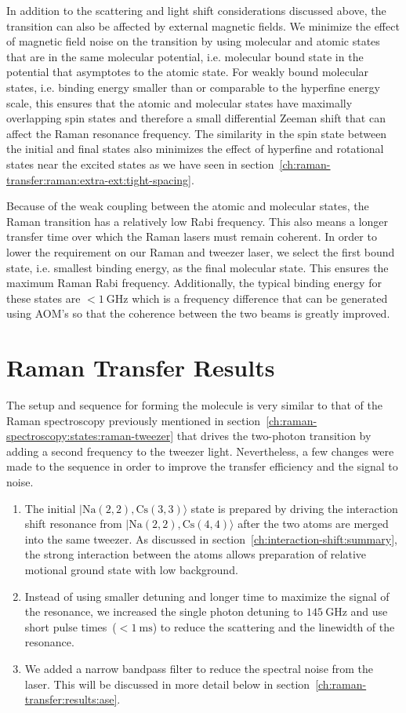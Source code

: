 In addition to the scattering and light shift considerations discussed above,
the transition can also be affected by external magnetic fields.
We minimize the effect of magnetic field noise on the transition by using molecular
and atomic states that are in the same molecular potential,
i.e. molecular bound state in the potential that asymptotes to
the atomic state. For weakly bound molecular states,
i.e. binding energy smaller than or comparable to the hyperfine energy scale,
this ensures that the atomic and molecular states have maximally overlapping spin states
and therefore a small differential Zeeman shift that can affect the Raman resonance frequency.
The similarity in the spin state between the initial and final states
also minimizes the effect of hyperfine and rotational states near the excited states
as we have seen in section~\ref{ch:raman-transfer:raman:extra-ext:tight-spacing}.

Because of the weak coupling between the atomic and molecular states,
the Raman transition has a relatively low Rabi frequency.
This also means a longer transfer time over which the Raman lasers must remain coherent.
In order to lower the requirement on our Raman and tweezer laser,
we select the first bound state, i.e. smallest binding energy, as the final molecular state.
This ensures the maximum Raman Rabi frequency.
Additionally, the typical binding energy for these states are $<\!1~\mathrm{GHz}$
which is a frequency difference that can be generated using AOM's
so that the coherence between the two beams is greatly improved.

\section{Raman Transfer Results}
\label{ch:raman-transfer:results}

The setup and sequence for forming the molecule is very similar to
that of the Raman spectroscopy
previously mentioned in section~\ref{ch:raman-spectroscopy:states:raman-tweezer}
that drives the two-photon transition by adding a second frequency to the tweezer light.
Nevertheless, a few changes were made to the sequence in order to improve
the transfer efficiency and the signal to noise.
\begin{enumerate}
\item The initial $|\mathrm{Na(2,2),Cs(3,3)}\rangle$ state is prepared by driving the
  interaction shift resonance from $|\mathrm{Na(2,2),Cs(4,4)}\rangle$
  after the two atoms are merged into the same tweezer.
  As discussed in section~\ref{ch:interaction-shift:summary},
  the strong interaction between the atoms allows preparation of
  relative motional ground state with low background.
\item Instead of using smaller detuning and longer time to maximize the signal of the resonance,
  we increased the single photon detuning to $145~\mathrm{GHz}$
  and use short pulse times~($<\!1~\mathrm{ms}$)
  to reduce the scattering and the linewidth of the resonance.
\item We added a narrow bandpass filter to reduce the spectral noise from the laser.
  This will be discussed in more detail below in section~\ref{ch:raman-transfer:results:ase}.
\end{enumerate}

